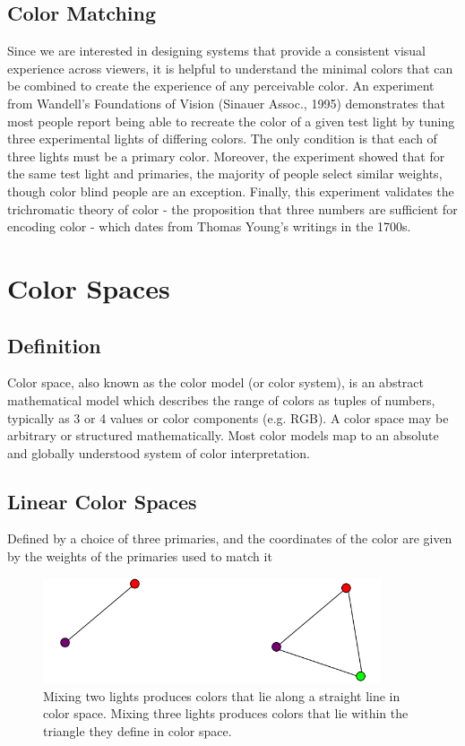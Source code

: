 \documentclass{article}
\begin{document}
\subsection{Color Matching}
Since we are interested in designing systems that provide a consistent visual experience across viewers, it is helpful to understand the minimal colors that can be combined to create the experience of any perceivable color. An experiment from Wandell's Foundations of Vision (Sinauer Assoc., 1995) demonstrates that most people report being able to recreate the color of a given test light by tuning three experimental lights of differing colors. The only condition is that each of three lights must be a primary color. Moreover, the experiment showed that for the same test light and primaries,	the majority of people select similar weights, though color blind people are an exception. Finally, this experiment validates the trichromatic theory of color - the proposition that three	numbers	are	sufficient	for	encoding color -  which dates from Thomas Young's writings in the 1700s.


\section{Color Spaces}
\subsection{Definition}
Color space, also known as the color model (or color system), is an abstract mathematical model which describes the range of colors as tuples of numbers, typically as 3 or 4 values or color components (e.g. RGB). A color space may be arbitrary or structured mathematically. Most color models map to an absolute and globally understood system of color interpretation.

\subsection{Linear Color Spaces}
	Defined by a choice of three primaries, and the coordinates of the color are given by the weights of the primaries used to match it

    \begin{figure}[h!]
    \centering
    \includegraphics[width=10cm]{color1.png}
    \caption{Mixing two lights produces colors that lie along a straight line in color space. Mixing three lights produces colors that lie within the triangle they define in color space.}
    \end{figure}
\end{document}
